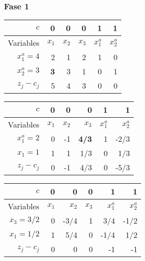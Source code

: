 \documentclass{beamer}
\begin{document}
\begin{frame}
\frametitle{Fase 1}

\begin{center}
\begin{tabular}{r | rrrrr}
$c$ & 0 & 0 & 0 & 1 & 1 \\ \hline
Variables & $x_1$ & $x_2$ & $x_3$ & $x^a_1$ & $x^a_2$ \\ \hline
$x_1^a=4$ & 2 & 1 & 2 & 1 & 0 \\
$x_2^a=3$   &\textbf{3} & 3 & 1 & 0 & 1  \\ \hline 
$z_j-c_j$ &  5 & 4 & 3 & 0 & 0 
\end{tabular}
\end{center}

\begin{center}
\begin{tabular}{r | rrrrr}
$c$ & 0 & 0 & 0 & 1 & 1 \\ \hline
Variables & $x_1$ & $x_2$ & $x_3$ & $x^a_1$ & $x^a_2$ \\ \hline
$x_1^a=2$ & 0 & -1 & \textbf{4/3} & 1 & -2/3 \\
$x_1=1$   & 1 & 1 & 1/3 & 0 & 1/3  \\ \hline 
$z_j-c_j$ &  0 & -1 & 4/3 & 0 & -5/3 
\end{tabular}
\end{center}


\begin{center}
\begin{tabular}{r | rrrrr}
$c$ & 0 & 0 & 0 & 1 & 1 \\ \hline
Variables & $x_1$ & $x_2$ & $x_3$ & $x^a_1$ & $x^a_2$ \\ \hline
$x_3=3/2$ & 0 & -3/4 & 1 & 3/4 & -1/2 \\
$x_1=1/2$   & 1 & 5/4 & 0 & -1/4 & 1/2  \\ \hline 
$z_j-c_j$ &  0 & 0 & 0 & -1 & -1 
\end{tabular}
\end{center}

\end{frame}
\end{document}
